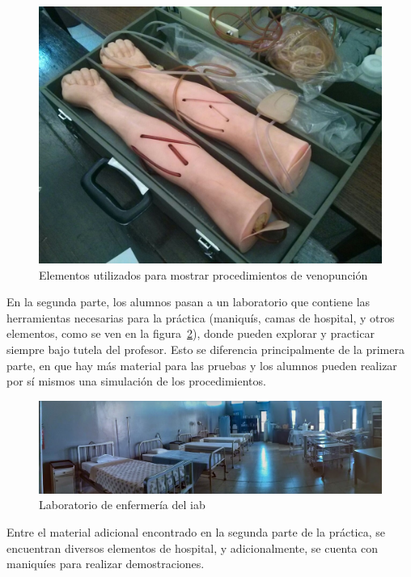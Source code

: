 \begin{figure}[h!t] 
\centering 
\includegraphics[scale=0.2,natwidth=100,natheight=100]{problema/iab_sala_2.jpg}
\caption{Elementos utilizados para mostrar procedimientos de venopunción}
\label{fig:iab_veno}
\end{figure}

En la segunda parte, los alumnos pasan a un laboratorio que contiene las
herramientas necesarias para la práctica (maniquís, camas de hospital, y otros
elementos, como se ven en la figura~\ref{fig:iab_lab}), donde pueden explorar y
practicar siempre bajo tutela del profesor. Esto se diferencia
principalmente de la primera parte, en que hay más material para las pruebas y los
alumnos pueden realizar por sí mismos una simulación de los procedimientos.

\begin{figure}[h!t] 
\centering 
\includegraphics[scale=0.3,natwidth=100,natheight=100]{problema/iab_sala_1.jpg}
\caption{Laboratorio de enfermería del \Gls{iab}}
\label{fig:iab_lab}
\end{figure}

Entre el material adicional encontrado en la segunda parte de la práctica, se 
encuentran diversos elementos de hospital, y adicionalmente, se cuenta con 
maniquíes para realizar demostraciones.

